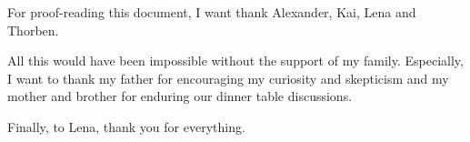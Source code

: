 For proof-reading this document, I want thank Alexander, Kai, Lena and  Thorben.

All this would have been impossible without the support of my family.
Especially, I want to thank my father for encouraging my curiosity and skepticism and 
my mother and brother for enduring our dinner table discussions.

Finally, to Lena, thank you for everything. 
